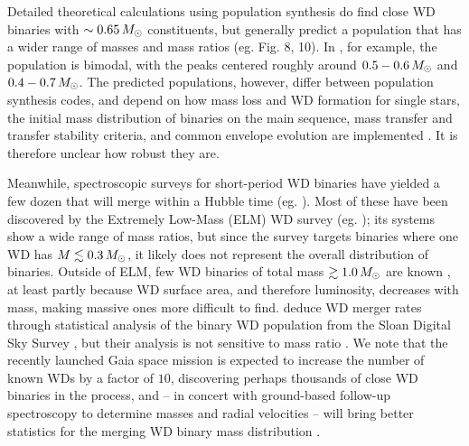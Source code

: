 
Detailed theoretical calculations using population synthesis do find close WD binaries with $\sim0.65\,\Msun$ constituents, but generally predict a population that has a wider range of masses and mass ratios (eg. \citealt{toon+14} Fig. 8, 10).  In \cite{toonnp12}, for example, the population is bimodal, with the peaks centered roughly around $0.5-0.6\,\Msun$ and $0.4-0.7\,\Msun$.  The predicted populations, however, differ between population synthesis codes, and depend on how mass loss and WD formation for single stars, the initial mass distribution of binaries on the main sequence, mass transfer and transfer stability criteria, and common envelope evolution are implemented \citep{toon+14, clae+14}.  It is therefore unclear how robust they are.

Meanwhile, spectroscopic surveys for short-period WD binaries have yielded a few dozen that will merge within a Hubble time (eg. \citealt{mars11, gian+15}).  Most of these have been discovered by the Extremely Low-Mass (ELM) WD survey (eg. \citealt{brow+10, gian+15}); its systems show a wide range of mass ratios, but since the survey targets binaries where one WD has $M\lesssim 0.3\,\Msun$, it likely does not represent the overall distribution of binaries.  Outside of ELM, few WD binaries of total mass $\gtrsim1.0\,\Msun$ are known \citep{napi+07, mars11}, at least partly because WD surface area, and therefore luminosity, decreases with mass, making massive ones more difficult to find.  \cite{badem12} deduce WD merger rates through statistical analysis of the binary WD population from the Sloan Digital Sky Survey \citep{york+00}, but their analysis is not sensitive to mass ratio \citep{maozbb12}.  We note that the recently launched Gaia space mission \citep{carr+14} is expected to increase the number of known WDs by a factor of $10$, discovering perhaps thousands of close WD binaries in the process, and -- in concert with ground-based follow-up spectroscopy to determine masses and radial velocities -- will bring better statistics for the merging WD binary mass distribution \citep{gaen+15}.


